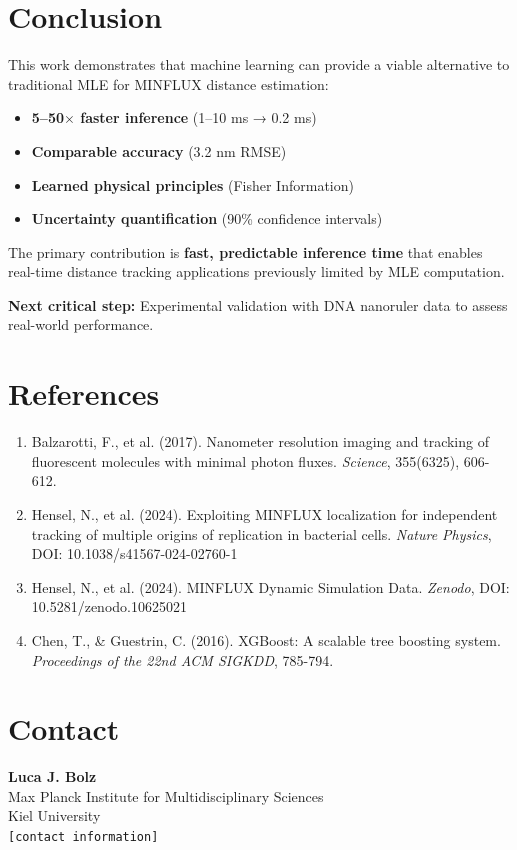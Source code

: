 \documentclass[a4paper,11pt]{article}
\begin{document}
\section{Conclusion}

This work demonstrates that machine learning can provide a viable alternative to traditional MLE for MINFLUX distance estimation:

\begin{itemize}[leftmargin=*]
    \item[\checkmark] \textbf{5--50$\times$ faster inference} (1--10 ms → 0.2 ms)
    \item[\checkmark] \textbf{Comparable accuracy} (3.2 nm RMSE)
    \item[\checkmark] \textbf{Learned physical principles} (Fisher Information)
    \item[\checkmark] \textbf{Uncertainty quantification} (90\% confidence intervals)
\end{itemize}

\vspace{0.5cm}

The primary contribution is \textbf{fast, predictable inference time} that enables real-time distance tracking applications previously limited by MLE computation.

\vspace{0.5cm}

\textbf{Next critical step:} Experimental validation with DNA nanoruler data to assess real-world performance.

\section*{References}

\begin{enumerate}[leftmargin=*]
    \item Balzarotti, F., et al. (2017). Nanometer resolution imaging and tracking of fluorescent molecules with minimal photon fluxes. \textit{Science}, 355(6325), 606-612.

    \item Hensel, N., et al. (2024). Exploiting MINFLUX localization for independent tracking of multiple origins of replication in bacterial cells. \textit{Nature Physics}, DOI: 10.1038/s41567-024-02760-1

    \item Hensel, N., et al. (2024). MINFLUX Dynamic Simulation Data. \textit{Zenodo}, DOI: 10.5281/zenodo.10625021

    \item Chen, T., \& Guestrin, C. (2016). XGBoost: A scalable tree boosting system. \textit{Proceedings of the 22nd ACM SIGKDD}, 785-794.
\end{enumerate}

\section*{Contact}

\textbf{Luca J. Bolz}\\
Max Planck Institute for Multidisciplinary Sciences\\
Kiel University\\
\texttt{[contact information]}
\end{document}
